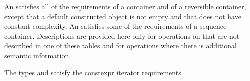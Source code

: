 \pnum
{}%
An  satisfies all of the requirements of a container and
of a reversible container, except that a default
constructed  object is not empty and that  does not have constant
complexity. An  satisfies some of the requirements of a sequence
container.
Descriptions are provided here
only for operations on  that are not described in
one of these tables and
for operations where there is additional semantic information.

\pnum
The types  and  satisfy
the constexpr iterator requirements.

%
%
%
%
%
